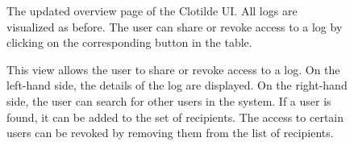\documentclass[../main.tex]{subfiles}
\begin{document}
\label{app:screenshots}
\begin{figure}[h!]
    \centering
    \caption[Clotilde UI: Overview]{
        The updated overview page of the Clotilde UI. 
        All logs are visualized as before. 
        The user can share or revoke access to a log by clicking on the corresponding button in the table.}
    \label{app:clotilde-overview}
\end{figure}
\newpage
\begin{figure}[h!]
    \centering
    \caption[Clotilde UI: Share and revoke access]{
        This view allows the user to share or revoke access to a log. 
        On the left-hand side, the details of the log are displayed. 
        On the right-hand side, the user can search for other users in the system. 
        If a user is found, it can be added to the set of recipients. 
        The access to certain users can be revoked by removing them from the list of recipients.}
    \label{app:clotilde-share}
\end{figure}
\end{document}
